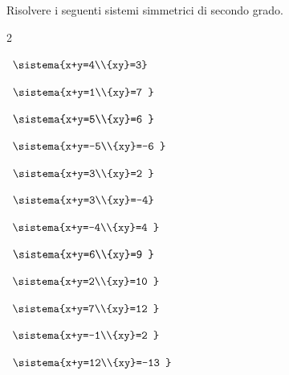 \subsection*{}

\begin{esercizio}[*]
\label{ese:6.14}
Risolvere i seguenti sistemi simmetrici di secondo grado.
\begin{htmulticols}{2}
\begin{enumeratea}
\item~\(\sistema{x+y=4\\{xy}=3}\)
\item~\(\sistema{x+y=1\\{xy}=7 }\)
\sol{\emptyset}
\item~\(\sistema{x+y=5\\{xy}=6 }\)
\item~\(\sistema{x+y=-5\\{xy}=-6 }\)
\item~\(\sistema{x+y=3\\{xy}=2 }\)
\item~\(\sistema{x+y=3\\{xy}=-4}\)
\item~\(\sistema{x+y=-4\\{xy}=4 }\)
\item~\(\sistema{x+y=6\\{xy}=9 }\)
\item~\(\sistema{x+y=2\\{xy}=10 }\)
\sol{\emptyset}
\item~\(\sistema{x+y=7\\{xy}=12 }\)
\item~\(\sistema{x+y=-1\\{xy}=2 }\)
\sol{\emptyset}
\item~\(\sistema{x+y=12\\{xy}=-13 }\)

\end{enumeratea}
\end{htmulticols}
\end{esercizio}
